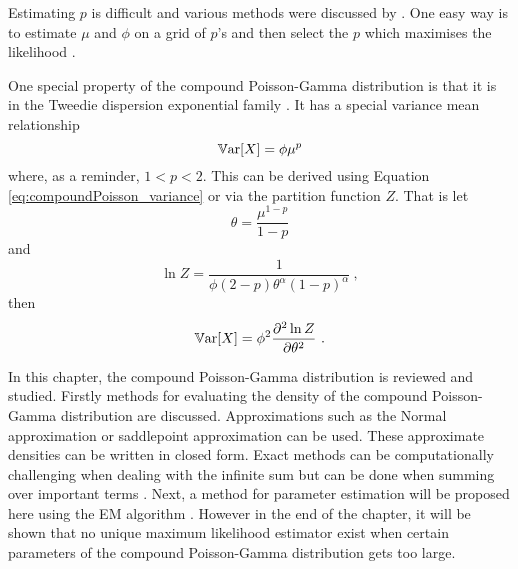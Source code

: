 Estimating $p$ is difficult and various methods were discussed by \cite{zhang2013likelihood}. One easy way is to estimate $\mu$ and $\phi$ on a grid of $p$'s and then select the $p$ which maximises the likelihood \citep{dunn2005series}.

One special property of the compound Poisson-Gamma distribution is that it is in the Tweedie dispersion exponential family \citep{jorgensen1987exponential}. It has a special variance mean relationship
\begin{equation}
	\operatorname{\mathbb{V}ar}[X] = \phi \mu^p
\end{equation}
where, as a reminder, $1<p<2$. This can be derived using Equation \eqref{eq:compoundPoisson_variance} or via the partition function $Z$. That is let
\begin{equation}
	\theta = \frac{\mu^{1-p}}{1-p}
\end{equation}
and
\begin{equation}
	\ln Z = \frac{1}{\phi(2-p)\theta^\alpha(1-p)^\alpha} \ ,
\end{equation}
then
\begin{equation}
	\operatorname{\mathbb{V}ar}[X] = \phi^2 \frac{\partial^2\ln Z}{\partial\theta^2} \ .
\end{equation}

In this chapter, the compound Poisson-Gamma distribution is reviewed and studied. Firstly methods for evaluating the density of the compound Poisson-Gamma distribution are discussed. Approximations such as the Normal approximation or saddlepoint approximation \citep{daniels1954saddlepoint} can be used. These approximate densities can be written in closed form. Exact methods can be computationally challenging when dealing with the infinite sum but can be done when summing over important terms \citep{dunn2005series}. Next, a method for parameter estimation will be proposed here using the EM algorithm \citep{dempster1977maximum}. However in the end of the chapter, it will be shown that no unique maximum likelihood estimator exist when certain parameters of the compound Poisson-Gamma distribution gets too large.

